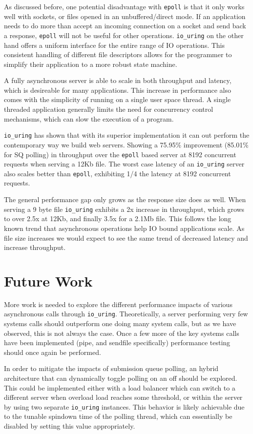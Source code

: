 \documentclass[letterpaper, 10pt, twocolumn]{article}
\begin{document}
As discussed before, one potential disadvantage with \texttt{epoll} is that it only works well with sockets, or files opened in an unbuffered/direct mode. If an application needs to do more than accept an incoming connection on a socket and send back a response, \texttt{epoll} will not be useful for other operations. \texttt{io\_uring} on the other hand offers a uniform interface for the entire range of IO operations. This consistent handling of different file descriptors allows for the programmer to simplify their application to a more robust state machine.

A fully asynchronous server is able to scale in both throughput and latency, which is desireable for many applications. This increase in performance also comes with the simplicity of running on a single user space thread. A single threaded application generally limits the need for concurrency control mechanisms, which can slow the execution of a program.

\texttt{io\_uring} has shown that with its superior implementation it can out perform the contemporary way we build web servers. Showing a 75.95\% improvement (85.01\% for SQ polling) in throughput over the \texttt{epoll} based server at 8192 concurrent requests when serving a 12Kb file. The worst case latency of an \texttt{io\_uring} server also scales better than \texttt{epoll}, exhibiting 1/4 the latency at 8192 concurrent requests.

The general performance gap only grows as the response size does as well. When serving a 9 byte file \texttt{io\_uring} exhibits a 2x increase in throughput, which grows to over 2.5x at 12Kb, and finally 3.5x for a 2.1Mb file. This follows the long known trend that asynchronous operations help IO bound applications scale. As file size increases we would expect to see the same trend of decreased latency and increase throughput.
\section{Future Work}
\label{sec:org41ba920}
More work is needed to explore the different performance impacts of various asynchronous calls through \texttt{io\_uring}. Theoretically, a server performing very few systems calls should outperform one doing many system calls, but as we have observed, this is not always the case. Once a few more of the key systems calls have been implemented (pipe, and sendfile specifically) performance testing should once again be performed.

In order to mitigate the impacts of submission queue polling, an hybrid architecture that can dynamically toggle polling on an off should be explored. This could be implemented either with a load balancer which can switch to a different server when overload load reaches some threshold, or within the server by using two separate \texttt{io\_uring} instances. This behavior is likely achievable due to the tunable spindown time of the polling thread, which can essentially be disabled by setting this value appropriately.
\end{document}
